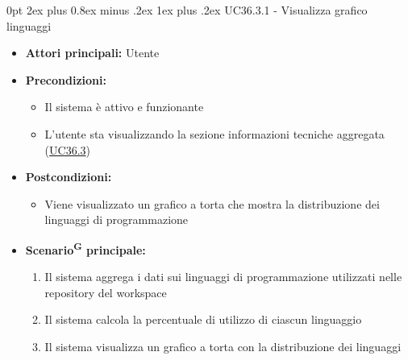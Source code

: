 \documentclass[a4paper, 11pt]{article}
\makeatletter
\renewcommand\subparagraph{\@startsection{subparagraph}{5}
  {0pt}
  {2ex plus 0.8ex minus .2ex}
  {1ex plus .2ex}
  {\normalfont\normalsize\bfseries\color{AccentColor}}}
\makeatother
\begin{document}
\subparagraph{UC36.3.1 - Visualizza grafico linguaggi}\label{UC36.3.1}
\begin{itemize}
    \item \textbf{Attori principali:} Utente
    \item \textbf{Precondizioni:}
    \begin{itemize}
        \item Il sistema è attivo e funzionante
        \item L'utente sta visualizzando la sezione informazioni tecniche aggregata (\hyperref[UC36.3]{UC36.3})
    \end{itemize}
    \item \textbf{Postcondizioni:}
    \begin{itemize}
        \item Viene visualizzato un grafico a torta che mostra la distribuzione dei linguaggi di programmazione
    \end{itemize}
    \item \textbf{Scenario\textsuperscript{G} principale:}
    \begin{enumerate}
        \item Il sistema aggrega i dati sui linguaggi di programmazione utilizzati nelle repository del workspace
        \item Il sistema calcola la percentuale di utilizzo di ciascun linguaggio
        \item Il sistema visualizza un grafico a torta con la distribuzione dei linguaggi
    \end{enumerate}
\end{itemize}
\end{document}
